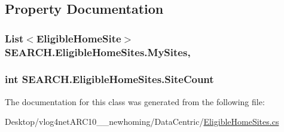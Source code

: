 \subsection{Property Documentation}
\hypertarget{class_s_e_a_r_c_h_1_1_eligible_home_sites_a684dbb1fed6dc8c5904d4679f2fc5d53}{
\subsubsection[{My\-Sites}]{\setlength{\rightskip}{0pt plus 5cm}List$<${\bf Eligible\-Home\-Site}$>$ S\-E\-A\-R\-C\-H.\-Eligible\-Home\-Sites.\-My\-Sites\hspace{0.3cm}{\ttfamily [get]}, {\ttfamily [set]}}}\label{class_s_e_a_r_c_h_1_1_eligible_home_sites_a684dbb1fed6dc8c5904d4679f2fc5d53}
\hypertarget{class_s_e_a_r_c_h_1_1_eligible_home_sites_ab66a08f1ef23f2a5799a1dd4fefaf1bf}{
\subsubsection[{Site\-Count}]{\setlength{\rightskip}{0pt plus 5cm}int S\-E\-A\-R\-C\-H.\-Eligible\-Home\-Sites.\-Site\-Count\hspace{0.3cm}{\ttfamily [get]}}}\label{class_s_e_a_r_c_h_1_1_eligible_home_sites_ab66a08f1ef23f2a5799a1dd4fefaf1bf}


The documentation for this class was generated from the following file\-:\begin{DoxyCompactItemize}
\item 
Desktop/vlog4net\-A\-R\-C10\-\_\-\_\-newhoming/\-Data\-Centric/\hyperlink{_eligible_home_sites_8cs}{Eligible\-Home\-Sites.\-cs}\end{DoxyCompactItemize}

